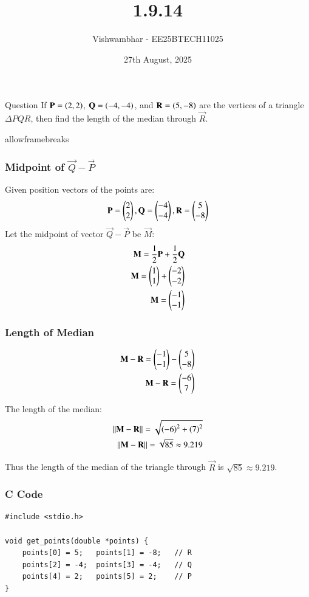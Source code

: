 \documentclass{beamer}
\title{1.9.14}
\date{27th August, 2025}
\author{Vishwambhar - EE25BTECH11025}
\begin{document}
\frame{\titlepage}
\begin{frame}{Question}
If $\vec{P}=\brak{2,2}$, $\vec{Q}=\brak{-4,-4}$, and $\vec{R}=\brak{5,-8}$ are the vertices of a triangle $\Delta PQR$, then find the length of the median through $\vec{R}$.\\
\end{frame}

\begin{frame}{allowframebreaks}
\frametitle{Midpoint of $\vec{Q}-\vec{P}$}
Given position vectors of the points are:
\begin{align}
    \vec{P}=\myvec{2\\2},
    \vec{Q}=\myvec{-4\\-4},
    \vec{R}=\myvec{5\\-8}
\end{align}
Let the midpoint of vector $\vec{Q}-\vec{P}$ be $\vec{M}$:
\begin{align}
    \vec{M}=\frac{1}{2}\vec{P}+\frac{1}{2}\vec{Q}\\
    \vec{M}=\myvec{1\\1}+\myvec{-2\\-2}\\
    \vec{M}=\myvec{-1\\-1}
\end{align}
\end{frame}

\begin{frame}[fragile]
\frametitle{Length of Median}
\begin{align}
    \vec{M}-\vec{R}=\myvec{-1\\-1}-\myvec{5\\-8}\\
    \vec{M}-\vec{R}=\myvec{-6\\7}
\end{align}

The length of the median:
\begin{align}
    ||\vec{M}-\vec{R}||=\sqrt{\brak{-6}^2+\brak{7}^2}\\
    ||\vec{M}-\vec{R}||=\sqrt{85}\approx9.219
\end{align}

Thus the length of the median of the triangle through $\vec{R}$ is $\sqrt{85}\approx9.219$.
\end{frame}

\begin{frame}[fragile]
    \frametitle{C Code}
    \begin{lstlisting}
#include <stdio.h>

void get_points(double *points) {
    points[0] = 5;   points[1] = -8;   // R
    points[2] = -4;  points[3] = -4;   // Q
    points[4] = 2;   points[5] = 2;    // P
}
    \end{lstlisting}
\end{frame}
\end{document}
